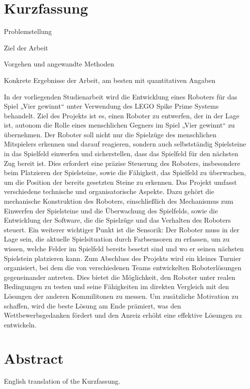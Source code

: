 \chapter*{Kurzfassung} %

Problemstellung

Ziel der Arbeit

Vorgehen und angewandte Methoden

Konkrete Ergebnisse der Arbeit, am besten mit quantitativen Angaben

In der vorliegenden Studienarbeit wird die Entwicklung eines Roboters für das Spiel „Vier gewinnt“ unter Verwendung des LEGO Spike Prime Systems behandelt. Ziel des Projekts ist es, einen Roboter zu entwerfen, der in der Lage ist, autonom die Rolle eines menschlichen Gegners im Spiel „Vier gewinnt“ zu übernehmen. Der Roboter soll nicht nur die Spielzüge des menschlichen Mitspielers erkennen und darauf reagieren, sondern auch selbstständig Spielsteine in das Spielfeld einwerfen und sicherstellen, dass das Spielfeld für den nächsten Zug bereit ist. Dies erfordert eine präzise Steuerung des Roboters, insbesondere beim Platzieren der Spielsteine, sowie die Fähigkeit, das Spielfeld zu überwachen, um die Position der bereits gesetzten Steine zu erkennen.
Das Projekt umfasst verschiedene technische und organisatorische Aspekte. Dazu gehört die mechanische Konstruktion des Roboters, einschließlich des Mechanismus zum Einwerfen der Spielsteine und die Überwachung des Spielfelds, sowie die Entwicklung der Software, die die Spielzüge und das Verhalten des Roboters steuert. Ein weiterer wichtiger Punkt ist die Sensorik: Der Roboter muss in der Lage sein, die aktuelle Spielsituation durch Farbsensoren zu erfassen, um zu wissen, welche Felder im Spielfeld bereits besetzt sind und wo er seinen nächsten Spielstein platzieren kann.
Zum Abschluss des Projekts wird ein kleines Turnier organisiert, bei dem die von verschiedenen Teams entwickelten Roboterlösungen gegeneinander antreten. Dies bietet die Möglichkeit, den Roboter unter realen Bedingungen zu testen und seine Fähigkeiten im direkten Vergleich mit den Lösungen der anderen Kommilitonen zu messen. Um zusätzliche Motivation zu schaffen, wird die beste Lösung am Ende prämiert, was den Wettbewerbsgedanken fördert und den Anreiz erhöht eine effektive Lösungen zu entwickeln.

\clearpage

\chapter*{Abstract} %

English translation of the \glqq Kurzfassung\grqq.

\clearpage